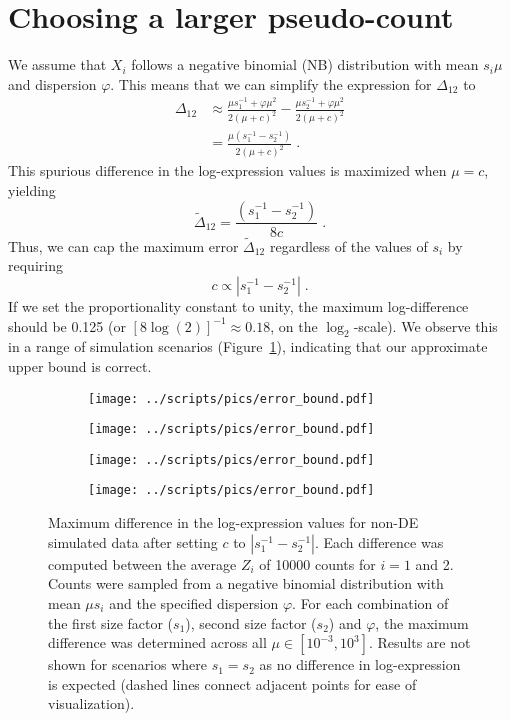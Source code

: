 \documentclass[10pt,letterpaper]{article}
\begin{document}
\section{Choosing a larger pseudo-count}
We assume that $X_i$ follows a negative binomial (NB) distribution with mean $s_i\mu$ and dispersion $\varphi$.
This means that we can simplify the expression for $\Delta_{12}$ to
\begin{align*}
\Delta_{12} 
&\approx \frac{\mu s_1^{-1} + \varphi \mu^2}{2(\mu + c)^2} - \frac{\mu s_2^{-1} + \varphi \mu^2}{2(\mu + c)^2} \\ 
&= \frac{\mu (s_1^{-1} - s_2^{-1})}{2(\mu + c)^2} \;.
\end{align*}
This spurious difference in the log-expression values is maximized when $\mu = c$, yielding 
\[
\tilde\Delta_{12} = \frac{(s_1^{-1} - s_2^{-1})}{8c} \;.
\]
Thus, we can cap the maximum error $\tilde\Delta_{12}$ regardless of the values of $s_i$ by requiring 
\[
    c \propto |s_1^{-1} - s_2^{-1}| \;.
\]
If we set the proportionality constant to unity, the maximum log-difference should be 0.125 (or $[8\log(2)]^{-1} \approx 0.18$, on the $\log_2$-scale).
We observe this in a range of simulation scenarios (Figure~\ref{fig:cappederr}), indicating that our approximate upper bound is correct. 

\begin{figure}[btp]
\centering
\begin{subfigure}[b]{0.49\textwidth}
    \texttt{[image: ../scripts/pics/error\_bound.pdf]}
    \caption{}
\end{subfigure}
\begin{subfigure}[b]{0.49\textwidth}
    \texttt{[image: ../scripts/pics/error\_bound.pdf]}
    \caption{}
\end{subfigure}
\begin{subfigure}[b]{0.49\textwidth}
    \texttt{[image: ../scripts/pics/error\_bound.pdf]}
    \caption{}
\end{subfigure}
\begin{subfigure}[b]{0.49\textwidth}
    \texttt{[image: ../scripts/pics/error\_bound.pdf]}
    \caption{}
\end{subfigure}
\caption{Maximum difference in the log-expression values for non-DE simulated data after setting $c$ to $|s_1^{-1} - s_2^{-1}|$.
Each difference was computed between the average $Z_i$ of 10000 counts for $i=1$ and 2.
Counts were sampled from a negative binomial distribution with mean $\mu s_i$ and the specified dispersion $\varphi$.
For each combination of the first size factor ($s_1$), second size factor ($s_2$) and $\varphi$, the maximum difference was determined across all $\mu \in [10^{-3}, 10^3]$.
Results are not shown for scenarios where $s_1=s_2$ as no difference in log-expression is expected (dashed lines connect adjacent points for ease of visualization).
}
\label{fig:cappederr}
\end{figure}
\end{document}
